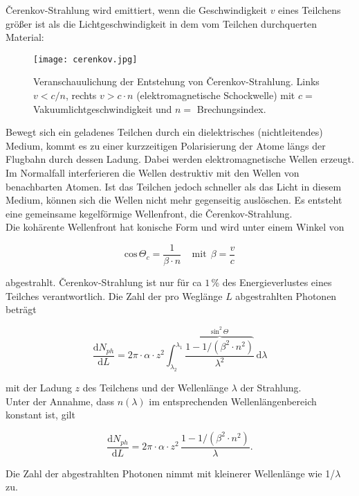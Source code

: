 \FloatBarrier
\v{C}erenkov-Strahlung wird emittiert, wenn die Geschwindigkeit $v$ eines Teilchens größer ist als
die Lichtgeschwindigkeit in dem vom Teilchen durchquerten Material:

\begin{figure}[H]
	\centering
	\texttt{[image: cerenkov.jpg]}
	\caption{Veranschauulichung der Entstehung von \v{C}erenkov-Strahlung. Links $v<c/n$, rechts
	$v>c\cdot n$ (elektromagnetische Schockwelle) mit $c=$ Vakuumlichtgeschwindigkeit und $n=$
	Brechungsindex. }
\end{figure}

Bewegt sich ein geladenes Teilchen durch ein dielektrisches (nichtleitendes) Medium, kommt es zu
einer kurzzeitigen Polarisierung der Atome längs der Flugbahn durch dessen Ladung. Dabei werden
elektromagnetische Wellen erzeugt. Im Normalfall interferieren die Wellen destruktiv mit den Wellen
von benachbarten Atomen. Ist das Teilchen jedoch schneller als das Licht in diesem Medium, können
sich die Wellen nicht mehr gegenseitig auslöschen. Es entsteht eine gemeinsame kegelförmige
Wellenfront, die \v{C}erenkov-Strahlung.
\\
Die kohärente Wellenfront hat konische Form und wird unter einem Winkel von 

\[\text{cos}\,\Theta_c=\frac{1}{\beta\cdot n}~~~~~\text{mit}~~\beta=\frac{v}{c}\]

abgestrahlt. \v{C}erenkov-Strahlung ist nur für ca $1\,$\% des Energieverlustes eines Teilches
verantwortlich. Die Zahl der pro Weglänge $L$ abgestrahlten Photonen beträgt

\[\frac{\mathrm{d}N_{ph}}{\mathrm{d}L}= 2\pi\cdot\alpha\cdot z^2 \int_{\lambda_2}^{\lambda_1}
\frac{\overbrace{1-1/(\beta^2\cdot n^2)}^{\text{sin}^2\,\Theta}}{\lambda^2}\,\mathrm{d}\lambda\]

mit der Ladung $z$ des Teilchens und der Wellenlänge $\lambda$ der Strahlung. 
\\
Unter der Annahme, dass $n(\lambda)$ im entsprechenden Wellenlängenbereich konstant ist, gilt

\[\frac{\mathrm{d}N_{ph}}{\mathrm{d}L}= 2\pi\cdot\alpha\cdot z^2 \,
\frac{1-1/(\beta^2\cdot n^2)}{\lambda}.\]

Die Zahl der abgestrahlten Photonen nimmt mit kleinerer Wellenlänge wie 1/$\lambda$ zu.

\FloatBarrier